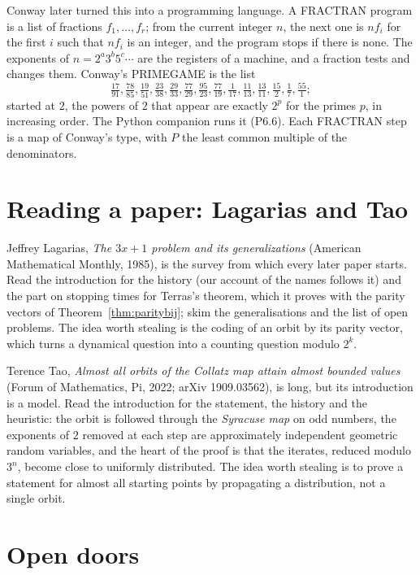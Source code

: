 \begin{remark}[FRACTRAN]\label{rem:fractran}
Conway later turned this into a programming language. A FRACTRAN program is a list of fractions $f_1,\dots,f_r$; from the current integer $n$, the next
one is $nf_i$ for the first $i$ such that $nf_i$ is an integer, and the program stops if there is none. The exponents of $n=2^a3^b5^c\cdots$ are the
registers of a machine, and a fraction tests and changes them. Conway's PRIMEGAME is the list
\[
\tfrac{17}{91},\tfrac{78}{85},\tfrac{19}{51},\tfrac{23}{38},\tfrac{29}{33},\tfrac{77}{29},\tfrac{95}{23},\tfrac{77}{19},\tfrac1{17},\tfrac{11}{13},\tfrac{13}{11},\tfrac{15}2,\tfrac17,\tfrac{55}1;
\]
started at $2$, the powers of $2$ that appear are exactly $2^p$ for the primes $p$, in increasing order. The Python companion runs it (P6.6). Each
FRACTRAN step is a map of Conway's type, with $P$ the least common multiple of the denominators.
\end{remark}

\section{Reading a paper: Lagarias and Tao}

Jeffrey Lagarias, \emph{The $3x+1$ problem and its generalizations} (American Mathematical Monthly, 1985), is the survey from which every later
paper starts. Read the introduction for the history (our account of the names follows it) and the part on stopping times for Terras's theorem, which it
proves with the parity vectors of Theorem~\ref{thm:paritybij}; skim the generalisations and the list of open problems. The idea worth stealing is the coding of an orbit by
its parity vector, which turns a dynamical question into a counting question modulo $2^k$.

Terence Tao, \emph{Almost all orbits of the Collatz map attain almost bounded values} (Forum of Mathematics, Pi, 2022; arXiv 1909.03562), is long, but
its introduction is a model. Read the introduction for the statement, the history and the heuristic: the orbit is followed through the
\emph{Syracuse map} on odd numbers, the exponents of $2$ removed at each step are approximately independent geometric random variables, and the heart
of the proof is that the iterates, reduced modulo $3^n$, become close to uniformly distributed. The idea worth stealing is to prove a statement for
almost all starting points by propagating a distribution, not a single orbit.

\section{Open doors}

